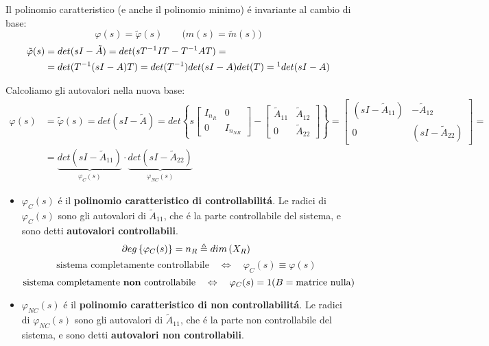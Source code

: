 \documentclass[../main.tex]{subfiles}
\begin{document}
		\newline
		
		Il polinomio caratteristico (e anche il polinomio minimo) \'e invariante al cambio di base:
		\[ \varphi(s) = \tilde \varphi(s) \qquad \big(  m(s) = \tilde m(s) \big) \]
		\begin{align*}
			\tilde \varphi(s) &= det(sI-\tilde A) = det(s T^{-1} I T - T^{-1} A T) =\\
			&= det(T^{-1} (sI-A) T) = det(T^{-1}) det(sI-A) det(T) =\footnotemark det(sI-A) 
		\end{align*}
		
		Calcoliamo gli autovalori nella nuova base:
		\begin{align*}
			\varphi(s) &= \tilde \varphi(s) = det(sI-\tilde A) = det\left\lbrace s
			\begin{bmatrix}
				I_{n_R} & 0\\
				0 & I_{n_{NR}}
			\end{bmatrix} -
			\begin{bmatrix}
				\tilde A_{11} & \tilde A_{12}\\
				0 & \tilde A_{22}
			\end{bmatrix} \right\rbrace =
			\begin{bmatrix}
				(sI-\tilde A_{11}) & -\tilde A_{12}\\
				0 & (sI-\tilde A_{22})
			\end{bmatrix} =
			\\
			&= \underbrace{det(sI-\tilde A_{11})}_{\varphi_C(s)} \cdot \underbrace{det(sI-\tilde A_{22})}_{\varphi_{NC}(s)}
		\end{align*}
		\begin{itemize}
			\item
				$ \varphi_C(s) $ \'e il \textbf{polinomio caratteristico di controllabilit\'a}. Le radici di $ \varphi_C(s) $ sono gli autovalori di $ \tilde A_{11} $, che \'e la parte controllabile del sistema, e sono detti \textbf{autovalori controllabili}.
				\[ \partial eg \left\lbrace \varphi_C(s) \right\rbrace = n_R \triangleq dim\left( X_R \right) \]
				\[ \text{sistema completamente controllabile} \quad\Leftrightarrow\quad \varphi_C(s) \equiv \varphi(s) \]
				\[ \text{sistema completamente \textbf{non} controllabile} \quad\Leftrightarrow\quad \varphi_C(s) = 1 (B = \text{matrice nulla}) \]
			\item
				$ \varphi_{NC}(s) $ \'e il \textbf{polinomio caratteristico di non controllabilit\'a}. Le radici di $ \varphi_{NC}(s) $ sono gli autovalori di $ \tilde A_{11} $, che \'e la parte non controllabile del sistema, e sono detti \textbf{autovalori non controllabili}.
		\end{itemize}
	
\end{document}
